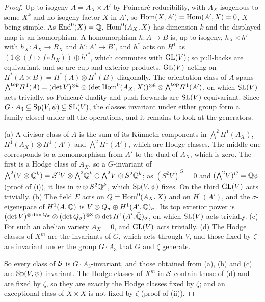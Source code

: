\begin{proof}
Up to isogeny $A=A_{X}\times A'$ by Poincar\'e reducibility, with $A_{X}$
isogenous to some $X^{k}$ and no isogeny factor $X$ in $A'$, so
$\operatorname{Hom}(X,A')=\operatorname{Hom}(A',X)=0$, $X$ being simple. As $\operatorname{End}^{0}(X)=\mathbb{Q}$,
$\operatorname{Hom}^{0}(A_{X},X)$ has dimension $k$ and the displayed map is an isomorphism.
A homomorphism $h\colon A\to B$ is, up to isogeny, $h_{X}\times h'$ with
$h_{X}\colon A_{X}\to B_{X}$ and $h'\colon A'\to B'$, and $h^{*}$ acts on
$H^{1}$ as $(1\otimes(f\mapsto f\circ h_{X}))\oplus h'^{*}$, which commutes
with $\operatorname{GL}(V)$; so pull-backs are equivariant, and so are cup and exterior
products, $\operatorname{GL}(V)$ acting on $H^{*}(A\times B)=H^{*}(A)\otimes H^{*}(B)$
diagonally. The orientation class of $A$ spans
${\textstyle\bigwedge^{\mathrm{top}}}H^{1}(A)=(\det V)^{\otimes k}\otimes
(\det\operatorname{Hom}^{0}(A_{X},X))^{\otimes8}\otimes{\textstyle\bigwedge^{\mathrm{top}}}H^{1}(A')$, on
which $\operatorname{SL}(V)$ acts trivially, so Poincar\'e duality and push-forwards are
$\operatorname{SL}(V)$-equivariant. Since $G\cdot A_{3}\subseteq\operatorname{Sp}(V,\psi)\subseteq\operatorname{SL}(V)$,
the classes invariant under either group form a family closed under all the
operations, and it remains to look at the generators.

(a) A divisor class of $A$ is the sum of its K\"unneth components in
${\textstyle\bigwedge^{2}}H^{1}(A_{X})$, $H^{1}(A_{X})\otimes H^{1}(A')$ and
${\textstyle\bigwedge^{2}}H^{1}(A')$, which are Hodge classes. The middle one corresponds to a
homomorphism from $A'$ to the dual of $A_{X}$, which is zero. The first is a
Hodge class of $A_{X}$, so a $G$-invariant of ${\textstyle\bigwedge^{2}}(V\otimes\mathbb{Q}^{k})=
S^{2}V\otimes{\textstyle\bigwedge^{2}}\mathbb{Q}^{k}\oplus{\textstyle\bigwedge^{2}}V\otimes S^{2}\mathbb{Q}^{k}$; as
$(S^{2}V)^{G}=0$ and $({\textstyle\bigwedge^{2}}V)^{G}=\mathbb{Q}\psi$ (proof of
(i)), it lies in
$\psi\otimes S^{2}\mathbb{Q}^{k}$, which $\operatorname{Sp}(V,\psi)$ fixes. On the third $\operatorname{GL}(V)$
acts trivially. (b) The field $E$ acts on $Q=\operatorname{Hom}^{0}(A_{X},X)$ and on
$H^{1}(A')$, and the $\sigma$-eigenspace of $H^{1}(A,\bar{\mathbb{Q}})$ is
$V\otimes Q_{\sigma}\oplus H^{1}(A',\bar{\mathbb{Q}})_{\sigma}$. Its top exterior
power is $(\det V)^{\otimes\dim Q_{\sigma}}\otimes(\det Q_{\sigma})^{\otimes8}
\otimes\det H^{1}(A',\bar{\mathbb{Q}})_{\sigma}$, on which $\operatorname{SL}(V)$ acts trivially.
(c) For such an abelian variety
$A_{X}=0$, and $\operatorname{GL}(V)$ acts trivially. (d) The Hodge classes of $X^{m}$ are
the invariants of $G$, which acts through $V$, and those fixed by $\zeta$ are
invariant under the group $G\cdot A_{3}$ that $G$ and $\zeta$ generate.

So every class of $\mathcal{S}$ is $G\cdot A_{3}$-invariant, and those obtained from
(a), (b) and (c) are $\operatorname{Sp}(V,\psi)$-invariant. The Hodge classes of $X^{m}$ in
$\mathcal{S}$ contain those of (d) and are fixed by $\zeta$, so they are exactly the
Hodge classes fixed by $\zeta$; and an exceptional class of $X\times X$ is not
fixed by $\zeta$ (proof of (ii)).
\end{proof}

